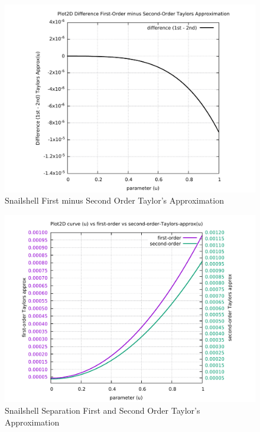 \begin{figure}
	\caption     {Snailshell First minus Second Order Taylor's Approximation}
	\label{06-img-Snailshell-First-minus-Second-Order-Taylors-Approx.pdf}
	\includegraphics[width=1.00\textwidth]{Chap4/appendix/app-Snailshell/plots/06-img-Snailshell-First-minus-Second-Order-Taylors-Approx.pdf}
\end{figure}

\clearpage
\pagebreak

\begin{figure}
	\caption     {Snailshell Separation First and Second Order Taylor's Approximation}
	\label{07-img-Snailshell-Separation-First-and-Second-Order-Taylors-Approx.pdf}
	\includegraphics[width=1.00\textwidth]{Chap4/appendix/app-Snailshell/plots/07-img-Snailshell-Separation-First-and-Second-Order-Taylors-Approx.pdf}
\end{figure}


